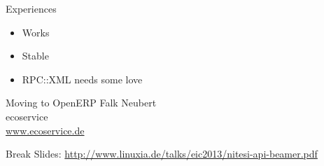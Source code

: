 \begin{frame}{Experiences}
\begin{itemize}
\item Works
\item Stable
\item RPC::XML needs some love
\end{itemize}
\end{frame}

\begin{frame}{Moving to OpenERP}
Falk Neubert \\
ecoservice \\
\url{www.ecoservice.de}
\end{frame}

\begin{frame}{Break}
Slides:
\url{http://www.linuxia.de/talks/eic2013/nitesi-api-beamer.pdf}
\end{frame}



